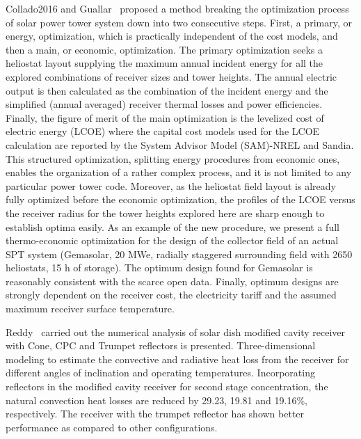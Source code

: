 Collado2016 and Guallar~\cite{Collado2016} proposed a method breaking the optimization process of solar power tower system down into two consecutive steps.
First, a primary, or energy, optimization, which is practically independent of the cost models, and then a main, or economic, optimization. The primary optimization seeks a heliostat layout supplying the maximum annual incident energy for all the explored combinations of receiver sizes and tower heights. The annual electric output is then calculated as the combination of the incident energy and the simplified (annual averaged) receiver thermal losses and power efficiencies. Finally, the figure of merit of the main optimization is the levelized cost of electric energy (LCOE) where the capital cost models used for the LCOE calculation are reported by the System Advisor Model (SAM)-NREL and Sandia. This structured optimization, splitting energy procedures from economic ones, enables the organization of a rather complex process, and it is not limited to any particular power tower code. Moreover, as the heliostat field layout is already fully optimized before the economic optimization, the profiles of the LCOE versus the receiver radius for the tower heights explored here are sharp enough to establish optima easily. As an example of the new procedure, we present a full thermo-economic optimization for the design of the collector field of an actual SPT system (Gemasolar, 20 MWe, radially staggered surrounding field with 2650 heliostats, 15 h of storage). The optimum design found for Gemasolar is reasonably consistent with the scarce open data. Finally, optimum designs are strongly dependent on the receiver cost, the electricity tariff and the assumed maximum receiver surface temperature.

Reddy~\cite{Reddy2009} carried out the numerical analysis of solar dish modified cavity receiver with Cone, CPC and Trumpet reflectors is presented. Three-dimensional modeling to estimate the convective and radiative heat loss from the receiver for different angles of inclination and operating temperatures. Incorporating reflectors in the modified cavity receiver for second stage concentration, the natural convection heat losses are reduced by 29.23, 19.81 and 19.16\%, respectively. The receiver with the trumpet reflector has shown better performance as compared to other configurations.

